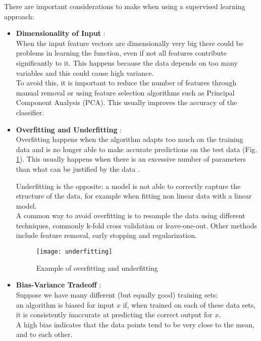 There are important considerations to make when using a supervised learning approach:
\begin{itemize}
	\item \textbf{Dimensionality of Input} \cite{wiki:dim_red}:\\ 
	When the input feature vectors are dimensionally very big there could be problems in learning the function, even if not all features contribute significantly to it. This happens because the data depends on too many variables and this could cause high variance. \\
	To avoid this, it is important to reduce the number of features through manual removal or using feature selection algorithms such as Principal Component Analysis (PCA). This usually improves the accuracy of the classifier.
	
	\item \textbf{Overfitting and Underfitting} \cite{overfit}: \\	
	Overfitting happens when the algorithm adapts too much on the training data and is no longer able to make accurate predictions on the test data (Fig. \ref{fig:underfitting}). This usually happens when there is an excessive number of parameters than what can be justified by the data \cite{camb_over}. 
	
	Underfitting is the opposite: a model is not able to correctly capture the structure of the data, for example when fitting non linear data with a linear model. \\
	A common way to avoid overfitting is to resample the data using different techniques, commonly k-fold cross validation or leave-one-out. Other methods include feature removal, early stopping and regularization.
	
	\begin{figure}[H]
		\centering
		\texttt{[image: underfitting]}
		\caption{Example of overfitting and underfitting \cite{underfitting}}
		\label{fig:underfitting}
	\end{figure}	
	
	\item \textbf{Bias-Variance Tradeoff} \cite{biasvar}: \\	
	Suppose we have many different (but equally good) training sets: \\
	an algorithm is biased for input $x$ if, when trained on each of these data sets, it is consistently inaccurate at predicting the correct output for $x$. \\
	A high bias indicates that the data points tend to be very close to the mean, and to each other.
	

\end{itemize}
